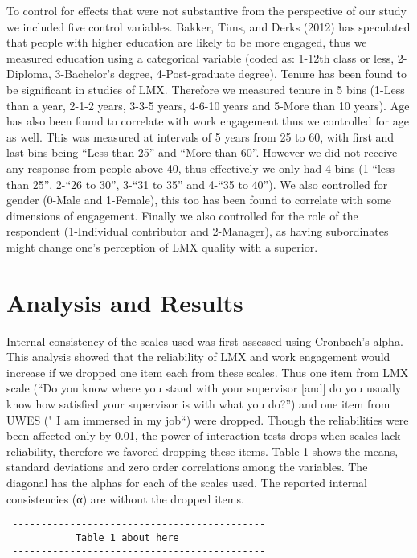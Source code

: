 \documentclass[12pt,a4paper,]{article}
\begin{document}
To control for effects that were not substantive from the perspective of
our study we included five control variables. Bakker, Tims, and Derks
(2012) has speculated that people with higher education are likely to be
more engaged, thus we measured education using a categorical variable
(coded as: 1-12th class or less, 2-Diploma, 3-Bachelor's degree,
4-Post-graduate degree). Tenure has been found to be significant in
studies of LMX. Therefore we measured tenure in 5 bins (1-Less than a
year, 2-1-2 years, 3-3-5 years, 4-6-10 years and 5-More than 10 years).
Age has also been found to correlate with work engagement thus we
controlled for age as well. This was measured at intervals of 5 years
from 25 to 60, with first and last bins being ``Less than 25'' and
``More than 60''. However we did not receive any response from people
above 40, thus effectively we only had 4 bins (1-``less than 25'',
2-``26 to 30'', 3-``31 to 35'' and 4-``35 to 40''). We also controlled
for gender (0-Male and 1-Female), this too has been found to correlate
with some dimensions of engagement. Finally we also controlled for the
role of the respondent (1-Individual contributor and 2-Manager), as
having subordinates might change one's perception of LMX quality with a
superior.

\section{Analysis and Results}\label{analysis-and-results}

Internal consistency of the scales used was first assessed using
Cronbach's alpha. This analysis showed that the reliability of LMX and
work engagement would increase if we dropped one item each from these
scales. Thus one item from LMX scale (``Do you know where you stand with
your supervisor {[}and{]} do you usually know how satisfied your
supervisor is with what you do?'') and one item from UWES (" I am
immersed in my job``) were dropped. Though the reliabilities were been
affected only by 0.01, the power of interaction tests drops when scales
lack reliability, therefore we favored dropping these items. Table 1
shows the means, standard deviations and zero order correlations among
the variables. The diagonal has the alphas for each of the scales used.
The reported internal consistencies (α) are without the dropped items.

\begin{verbatim}
 --------------------------------------------
            Table 1 about here               
 --------------------------------------------
\end{verbatim}
\end{document}
